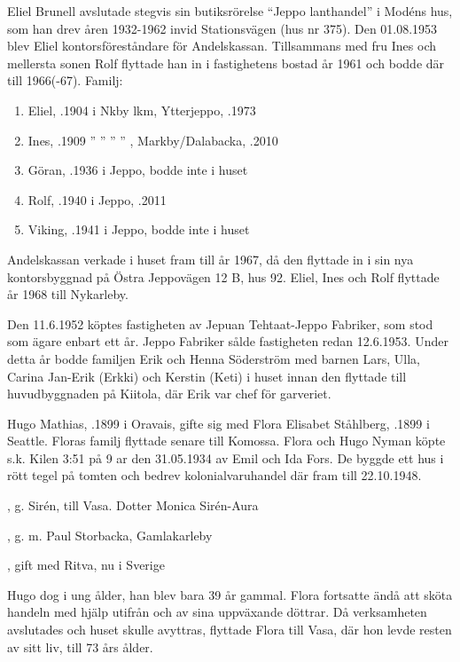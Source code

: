 Eliel Brunell avslutade stegvis sin butiksrörelse ``Jeppo lanthandel'' i 	Modéns hus, som han drev åren 1932-1962 invid Stationsvägen (hus nr 375). Den 01.08.1953 blev Eliel kontorsföreståndare för Andelskassan. Tillsammans med fru Ines och mellersta sonen Rolf flyttade han in i fastighetens bostad år 1961 och bodde där till 1966(-67).
Familj:
\begin{enumerate}
  \item Eliel, .1904 i Nkby lkm, Ytterjeppo, .1973
  \item Ines, .1909 	'' ''   ''    ''   , Markby/Dalabacka, .2010
  \item Göran, .1936 i Jeppo, bodde inte i huset
  \item Rolf, .1940 i Jeppo, .2011
  \item Viking, .1941  i Jeppo, bodde inte i huset
\end{enumerate}
Andelskassan verkade i huset fram till år 1967, då den flyttade in i sin nya kontorsbyggnad på Östra Jeppovägen 12 B, hus 92. Eliel, Ines och Rolf flyttade år 1968 till Nykarleby.


Den 11.6.1952 köptes fastigheten av Jepuan Tehtaat-Jeppo Fabriker, som stod som ägare enbart ett år. Jeppo Fabriker sålde fastigheten redan 12.6.1953. Under detta år bodde familjen Erik och Henna Söderström med barnen Lars, Ulla, Carina Jan-Erik (Erkki) och Kerstin (Keti) i huset innan den flyttade till huvudbyggnaden på Kiitola, där Erik var chef för garveriet.


Hugo Mathias, .1899 i Oravais, gifte sig med Flora Elisabet Ståhlberg, .1899 i Seattle. Floras familj flyttade senare till Komossa. Flora och Hugo Nyman köpte s.k. Kilen 3:51 på 9 ar den 31.05.1934 av Emil och Ida Fors. De byggde ett hus i rött tegel på tomten och bedrev kolonialvaruhandel där fram till 22.10.1948.
\begin{jhchildren}
  \item {}, g. Sirén, till Vasa. Dotter Monica Sirén-Aura
  \item {}, g. m. Paul Storbacka, Gamlakarleby
  \item {}, gift med Ritva, nu i Sverige
\end{jhchildren}
Hugo dog i ung ålder, han blev bara 39 år gammal. Flora fortsatte ändå att sköta handeln med hjälp utifrån och av sina uppväxande döttrar. Då verksamheten avslutades och huset skulle avyttras, flyttade Flora till Vasa, där hon levde resten av sitt liv, till 73 års ålder.


